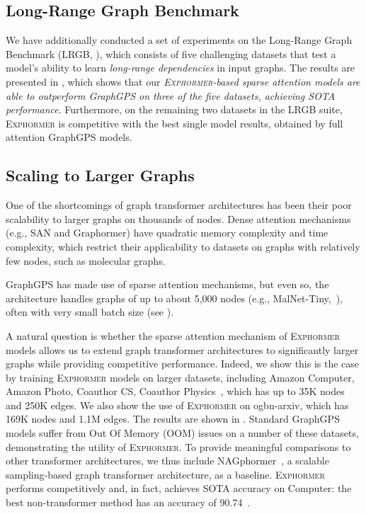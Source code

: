 \documentclass{article}
\theoremstyle{plain}
\theoremstyle{definition}
\theoremstyle{remark}
\begin{document}
\subsection{Long-Range Graph Benchmark}
We have additionally conducted a set of experiments on the Long-Range Graph Benchmark (LRGB, \citealp{lrgb-2022}), which consists of five challenging datasets that test a model's ability to learn \emph{long-range dependencies} in input graphs. The results are presented in , which shows that our \emph{\textsc{Exphormer}-based sparse attention models are able to outperform GraphGPS on three of the five datasets, achieving SOTA performance}. Furthermore, on the remaining two datasets in the LRGB suite, \textsc{Exphormer} is competitive with the best single model results, obtained by full attention GraphGPS models.


\subsection{Scaling to Larger Graphs}
One of the shortcomings of graph transformer architectures has been their poor scalability to larger graphs on thousands of nodes. Dense attention mechanisms (e.g., SAN and Graphormer) have quadratic memory complexity and time complexity, which restrict their applicability to datasets on graphs with relatively few nodes, such as molecular graphs.

GraphGPS has made use of sparse attention mechanisms, but even so, the architecture handles graphs of up to about 5,000 nodes (e.g., MalNet-Tiny,~\citealp{FreitasDNC21}), often with very small batch size (see ).



A natural question is whether the sparse attention mechanism of \textsc{Exphormer} models allows us to extend graph transformer architectures to significantly larger graphs while providing competitive performance. Indeed, we show this is the case by training \textsc{Exphormer} models on larger datasets, including Amazon Computer, Amazon Photo, Coauthor CS, Coauthor Physics~\citep{amazon_dataset}, which has up to 35K nodes and 250K edges. We also show the use of \textsc{Exphormer} on ogbn-arxiv, which has 169K nodes and 1.1M edges. The results are shown in . Standard GraphGPS models suffer from Out Of Memory (OOM) issues on a number of these datasets, demonstrating the utility of \textsc{Exphormer}. To provide meaningful comparisons to other transformer architectures, we thus include NAGphormer~\citep{nagphormer22}, a scalable sampling-based graph transformer architecture, as a baseline. \textsc{Exphormer} performs competitively and, in fact, achieves SOTA accuracy on Computer: the best non-transformer method has an accuracy of 90.74~\citep{computersSOTA}.
\end{document}
